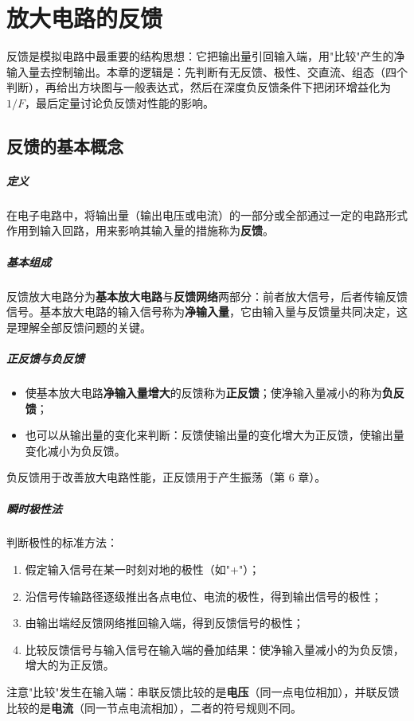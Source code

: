 \chapter{放大电路的反馈}

反馈是模拟电路中最重要的结构思想：它把输出量引回输入端，用"比较"产生的净输入量去控制输出。本章的逻辑是：先判断有无反馈、极性、交直流、组态（四个判断），再给出方块图与一般表达式，然后在深度负反馈条件下把闭环增益化为 $1/F$，最后定量讨论负反馈对性能的影响。

\section{反馈的基本概念}

\paragraph{定义}
在电子电路中，将输出量（输出电压或电流）的一部分或全部通过一定的电路形式作用到输入回路，用来影响其输入量的措施称为\textbf{反馈}。

\paragraph{基本组成}
反馈放大电路分为\textbf{基本放大电路}与\textbf{反馈网络}两部分：前者放大信号，后者传输反馈信号。基本放大电路的输入信号称为\textbf{净输入量}，它由输入量与反馈量共同决定，这是理解全部反馈问题的关键。

\paragraph{正反馈与负反馈}
\begin{itemize}
    \item 使基本放大电路\textbf{净输入量增大}的反馈称为\textbf{正反馈}；使净输入量减小的称为\textbf{负反馈}；
    \item 也可以从输出量的变化来判断：反馈使输出量的变化增大为正反馈，使输出量变化减小为负反馈。
\end{itemize}
负反馈用于改善放大电路性能，正反馈用于产生振荡（第 6 章）。

\paragraph{瞬时极性法}
判断极性的标准方法：
\begin{enumerate}
    \item 假定输入信号在某一时刻对地的极性（如"+"）；
    \item 沿信号传输路径逐级推出各点电位、电流的极性，得到输出信号的极性；
    \item 由输出端经反馈网络推回输入端，得到反馈信号的极性；
    \item 比较反馈信号与输入信号在输入端的叠加结果：使净输入量减小的为负反馈，增大的为正反馈。
\end{enumerate}
注意"比较"发生在输入端：串联反馈比较的是\textbf{电压}（同一点电位相加），并联反馈比较的是\textbf{电流}（同一节点电流相加），二者的符号规则不同。

